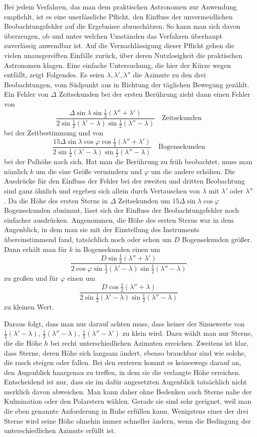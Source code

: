 Bei jedem Verfahren, das man dem praktischen Astronomen zur Anwendung empfiehlt, ist es eine unerlässliche Pflicht, den Einfluss der unvermeidlichen Beobachtungsfehler auf die Ergebnisse abzuschätzen. So kann man sich davon überzeugen, ob und unter welchen Umständen das Verfahren überhaupt zuverlässig anwendbar ist. Auf die Vernachlässigung dieser Pflicht gehen die vielen unausgereiften Einfälle zurück, über deren Nutzlosigkeit die praktischen Astronomen klagen. Eine einfache Untersuchung, die hier der Kürze wegen entfällt,
%
zeigt Folgendes. Es seien $\lambda,\lambda',\lambda''$ die Azimute zu den drei Beobachtungen, vom Südpunkt aus in Richtung der täglichen Bewegung gezählt. Ein Fehler von $\Delta$ Zeitsekunden bei der ersten Berührung zieht dann einen Fehler von
\[
\frac{\Delta\sin\lambda\sin\tfrac12(\lambda''+\lambda')}{2\sin\tfrac12(\lambda'-\lambda)\sin\tfrac12(\lambda''-\lambda)}\quad\text{Zeitsekunden}
\]
bei der Zeitbestimmung und von
\[
\frac{15\Delta\sin\lambda\cos\varphi\cos\tfrac12(\lambda''+\lambda')}{2\sin\tfrac12(\lambda'-\lambda)\sin\tfrac12(\lambda''-\lambda)}\quad\text{Bogensekunden}
\]
bei der Polhöhe nach sich. Hat man die Berührung zu früh beobachtet, muss man nämlich $k$ um die eine Größe vermindern und $\varphi$ um die andere erhöhen. Die Ausdrücke für den Einfluss der Fehler bei der zweiten und dritten Beobachtung sind ganz ähnlich und ergeben sich allein durch Vertauschen von $\lambda$ mit $\lambda'$ oder $\lambda''$. Da die Höhe des ersten Sterns in $\Delta$ Zeitsekunden um $15\Delta\sin\lambda\cos\varphi$ Bogensekunden abnimmt, lässt sich der Einfluss der Beobachtungsfehler noch einfacher ausdrücken. Angenommen, die Höhe des ersten Sterns war in dem Augenblick, in dem man sie mit der Einstellung des Instruments übereinstimmend fand, tatsächlich noch oder schon um $D$ Bogensekunden größer. Dann erhält man für $k$ in Bogensekunden einen um
\[
\frac{D\sin\tfrac12(\lambda''+\lambda')}{2\cos\varphi\sin\tfrac12(\lambda'-\lambda)\sin\tfrac12(\lambda''-\lambda)}
\]
zu großen und für $\varphi$ einen um
\[
\frac{D\cos\tfrac12(\lambda''+\lambda)}{2\sin\tfrac12(\lambda'-\lambda)\sin\tfrac12(\lambda''-\lambda)}
\]
zu kleinen Wert.

Daraus folgt, dass man nur darauf achten muss, dass keiner der Sinuswerte von $\tfrac12(\lambda'-\lambda)$, $\tfrac12(\lambda''-\lambda)$, $\tfrac12(\lambda''-\lambda')$ zu klein wird. Dazu wählt man nur Sterne, die die Höhe $h$ bei recht unterschiedlichen Azimuten erreichen. Zweitens ist klar, dass Sterne, deren Höhe sich langsam ändert, ebenso brauchbar sind wie solche, die rasch steigen oder fallen. Bei den ersteren kommt es keineswegs darauf an, den Augenblick haargenau zu treffen, in dem sie die verlangte Höhe erreichen. Entscheidend ist nur, dass sie im dafür angesetzten Augenblick tatsächlich nicht merklich davon abweichen. Man kann daher ohne Bedenken auch Sterne nahe der Kulmination oder den Polarstern wählen. Gerade sie sind sehr geeignet,
%
weil man die eben genannte Anforderung in Ruhe erfüllen kann. Wenigstens einer der drei Sterne wird seine Höhe ohnehin immer schneller ändern, wenn die Bedingung der unterschiedlichen Azimute erfüllt ist.

